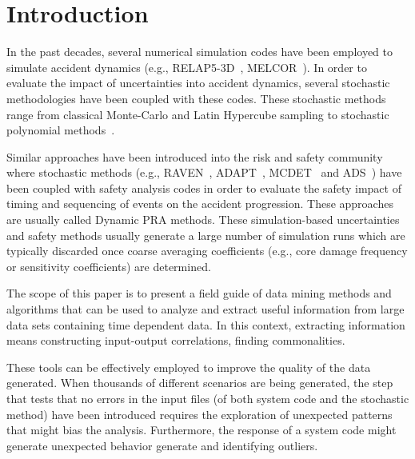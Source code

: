 \section{Introduction}
\label{sec:introduction}

In the past decades, several numerical simulation codes have been employed to simulate accident 
dynamics (e.g., RELAP5-3D~\cite{relap5}, MELCOR~\cite{Melcor}). In order to evaluate the impact of uncertainties 
into accident dynamics, several stochastic methodologies have been coupled with these codes. 
These stochastic methods range from classical Monte-Carlo and Latin Hypercube sampling to 
stochastic polynomial methods~\cite{}. 

Similar approaches have been introduced into the risk and 
safety community where stochastic methods (e.g., RAVEN~\cite{RAVEN_PSAM_2014}, 
ADAPT~\cite{adapt}, MCDET~\cite{MCdet} and ADS~\cite{ADS}) have been 
coupled with safety analysis codes in order to evaluate the safety impact of timing and sequencing 
of events on the accident progression. These approaches are usually called Dynamic PRA methods. 
These simulation-based uncertainties and safety methods usually generate a large number of 
simulation runs which are typically discarded once coarse averaging coefficients (e.g., core 
damage frequency or sensitivity coefficients) are determined. 

The scope of this paper is to 
present a field guide of data mining methods and algorithms that can be used to analyze 
and extract useful information from large data sets containing time dependent data. In this 
context, extracting information means constructing input-output correlations, finding 
commonalities. 

These tools can be effectively employed to improve the quality of the data generated.
When thousands of different scenarios are being generated, the step that tests that no errors in
the input files (of both system code and the stochastic method) have been introduced requires
the exploration of unexpected patterns that might bias the analysis.
Furthermore, the response of a system code might generate unexpected behavior 
generate 
 and identifying outliers. 

